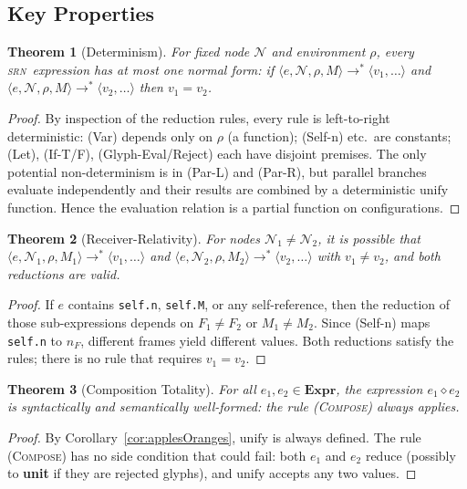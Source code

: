 \documentclass[twocolumn,11pt,a4paper]{article}
\newtheorem{theorem}{Theorem}[section]
\theoremstyle{definition}
\theoremstyle{remark}
\newcommand{\srn}{\textsc{srn}}
\newcommand{\Node}{\mathcal{N}}
\newcommand{\Expr}{\mathbf{Expr}}
\newcommand{\reducesN}{\longrightarrow^{*}}
\newcommand{\comp}{\mathbin{\diamond}}
\begin{document}
\subsection{Key Properties}

\begin{theorem}[Determinism]
\label{thm:determinism}
For fixed node $\Node$ and environment $\rho$, every \srn\ expression
has at most one normal form: if $\langle e, \Node, \rho, M \rangle
\reducesN \langle v_1, \ldots \rangle$ and $\langle e, \Node, \rho, M
\rangle \reducesN \langle v_2, \ldots \rangle$ then $v_1 = v_2$.
\end{theorem}
\begin{proof}
By inspection of the reduction rules, every rule is left-to-right
deterministic: (Var) depends only on $\rho$ (a function); (Self-n)
etc.\ are constants; (Let), (If-T/F), (Glyph-Eval/Reject) each have
disjoint premises.  The only potential non-determinism is in (Par-L)
and (Par-R), but parallel branches evaluate independently and their
results are combined by a deterministic $\mathrm{unify}$ function.
Hence the evaluation relation is a partial function on configurations.
\end{proof}

\begin{theorem}[Receiver-Relativity]
\label{thm:rr}
For nodes $\Node_1 \neq \Node_2$, it is possible that
$\langle e, \Node_1, \rho, M_1 \rangle \reducesN \langle v_1, \ldots \rangle$
and
$\langle e, \Node_2, \rho, M_2 \rangle \reducesN \langle v_2, \ldots \rangle$
with $v_1 \neq v_2$, and both reductions are valid.
\end{theorem}
\begin{proof}
If $e$ contains \texttt{self.n}, \texttt{self.M}, or any self-reference,
then the reduction of those sub-expressions depends on $F_1 \neq F_2$ or
$M_1 \neq M_2$.  Since (Self-n) maps \texttt{self.n} to $n_F$, different
frames yield different values.  Both reductions satisfy the rules; there
is no rule that requires $v_1 = v_2$.
\end{proof}

\begin{theorem}[Composition Totality]
\label{thm:total}
For all $e_1, e_2 \in \Expr$, the expression $e_1 \comp e_2$ is
syntactically and semantically well-formed: the rule \textsc{(Compose)}
always applies.
\end{theorem}
\begin{proof}
By Corollary~\ref{cor:applesOranges}, $\mathrm{unify}$ is always
defined.  The rule \textsc{(Compose)} has no side condition that could
fail: both $e_1$ and $e_2$ reduce (possibly to \textbf{unit} if they
are rejected glyphs), and $\mathrm{unify}$ accepts any two values.
\end{proof}
\end{document}
